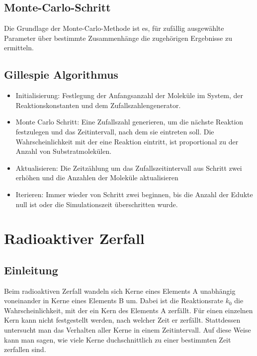\documentclass{scrartcl}
\begin{document}
 
\subsection{Monte-Carlo-Schritt}

Die Grundlage der Monte-Carlo-Methode ist es, für zufällig ausgewählte Parameter über bestimmte Zusammenhänge die zugehörigen Ergebnisse zu ermitteln.
\subsection{Gillespie Algorithmus}
\begin{itemize}
    \item{Initialisierung}: Festlegung der Anfangsanzahl der Moleküle im System, der Reaktionskonstanten und dem Zufallszahlengenerator.
\item{Monte Carlo Schritt}: Eine Zufallszahl generieren, um die nächste Reaktion festzulegen und das Zeitintervall, nach dem sie eintreten soll. Die Wahrscheinlichkeit mit der eine Reaktion eintritt, ist proportional zu der Anzahl von Substratmolekülen.
\item{Aktualisieren}: Die Zeitzählung um das Zufallszeitintervall aus Schritt zwei erhöhen und die Anzahlen der Moleküle aktualisieren
\item{Iterieren}: Immer wieder von Schritt zwei beginnen, bis die Anzahl der Edukte null ist oder die Simulationszeit überschritten wurde.
\end{itemize}

\newpage

\section{Radioaktiver Zerfall}
\subsection{Einleitung}
Beim radioaktiven Zerfall wandeln sich Kerne eines Elements A unabhängig voneinander in Kerne eines Elements B um. Dabei ist die Reaktionsrate $k_0$ die Wahrscheinlichkeit, mit der ein Kern des Elements A zerfällt. Für einen einzelnen Kern kann nicht festgestellt werden, nach welcher Zeit er zerfällt. Stattdessen untersucht man das Verhalten aller Kerne in einem Zeitintervall. Auf diese Weise kann man sagen, wie viele Kerne duchschnittlich zu einer bestimmten Zeit zerfallen sind.
\end{document}
